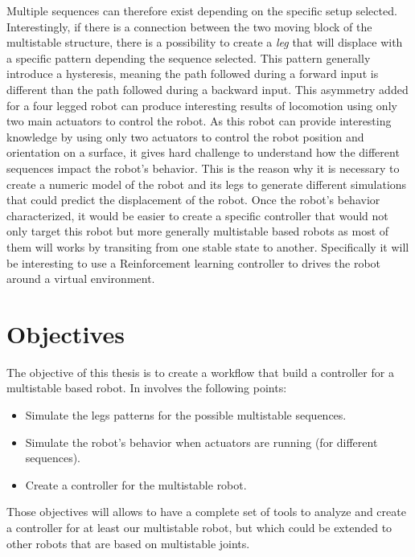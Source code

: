     Multiple sequences can therefore exist depending on the specific setup selected. Interestingly, if there is a connection between the two moving block of the multistable structure, there is a possibility to create a \textit{leg} that will displace with a specific pattern depending the sequence selected. This pattern generally introduce a hysteresis, meaning the path followed during a forward input is different than the path followed during a backward input. This asymmetry added for a four legged robot can produce interesting results of locomotion using only two main actuators to control the robot. As this robot can provide interesting knowledge by using only two actuators to control the robot position and orientation on a surface, it gives hard challenge to understand how the different sequences impact the robot's behavior. This is the reason why it is necessary to create a numeric model of the robot and its legs to generate different simulations that could predict the displacement of the robot. Once the robot's behavior characterized, it would be easier to create a specific controller that would not only target this robot but more generally multistable based robots as most of them will works by transiting from one stable state to another. Specifically it will be interesting to use a Reinforcement learning controller to drives the robot around a virtual environment.
    

\section{Objectives}
    The objective of this thesis is to create a workflow that build a controller for a multistable based robot. In involves the following points:
    \begin{itemize}
        \item Simulate the legs patterns for the possible multistable sequences.
        \item Simulate the robot's behavior when actuators are running (for different sequences).
        \item Create a controller for the multistable robot.
    \end{itemize}

    Those objectives will allows to have a complete set of tools to analyze and create a controller for at least our multistable robot, but which could be extended to other robots that are based on multistable joints.\\